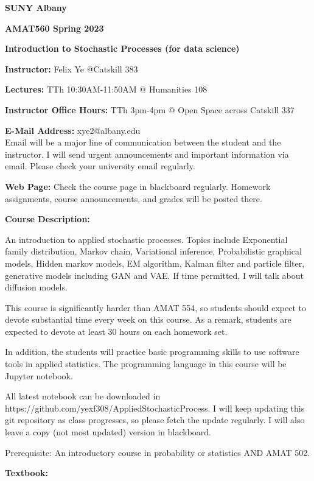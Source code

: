 \documentclass[a4paper,10pt]{article}
\begin{document}
\begin{center}

\textbf{SUNY Albany}

\textbf{AMAT560 Spring 2023}

\textbf{Introduction to Stochastic Processes (for data science)}


\end{center}

\textbf{Instructor:} Felix Ye @Catskill 383 

\textbf{Lectures:} TTh 10:30AM-11:50AM @ Humanities 108

\textbf{Instructor Office Hours:}   TTh 3pm-4pm @ Open Space across Catskill 337


\textbf{E-Mail Address:} xye2@albany.edu\\
Email will be a major line of communication between the student and the instructor. I will send urgent announcements and important information via email. Please check your university email regularly.

\textbf{Web Page:}
Check the course page in blackboard regularly. Homework assignments, course announcements, and grades will be posted there.


\textbf{Course Description:} 	
	
An introduction to applied stochastic processes. Topics include Exponential family distribution, Markov chain, Variational inference, Probabilistic graphical models, Hidden markov models, EM algorithm, Kalman filter and particle filter, generative models including GAN and VAE. If time permitted, I will talk about diffusion models. 

This course is significantly harder than AMAT 554, so students should expect to devote substantial time every week on this course. As a remark, students are expected to devote at least 30 hours on each homework set. 

In addition, the students will practice basic programming skills to use software tools in applied statistics. The programming language in this course will be Jupyter notebook. 

All latest notebook can be downloaded in https://github.com/yexf308/AppliedStochasticProcess. I will keep updating this git repository as class progresses, so please fetch the update regularly. I will also leave a copy (not most updated) version in blackboard. 

 Prerequisite: An introductory course in probability or statistics AND AMAT 502.
 

\textbf{Textbook:} 
\end{document}
